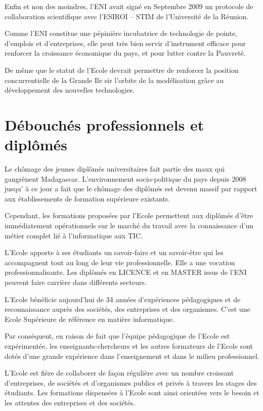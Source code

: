 \documentclass[12pt]{report}
\begin{document}
				Enfin et non des moindres, l’ENI avait signé en Septembre 2009 un protocole de collaboration scientifique avec l’ESIROI – STIM de l’Université de la Réunion.

				Comme l’ENI constitue une pépinière incubatrice de technologie de pointe, d’emplois et d’entreprises, elle peut très bien servir d’instrument efficace pour renforcer la croissance économique du pays, et pour lutter contre la Pauvreté.

				De même que le statut de l’Ecole devrait permettre de renforcer la position concurrentielle de la Grande Ile sir l’orbite de la modélisation grâce au développement des nouvelles technologies.

				\section{Débouchés professionnels et diplômés}

				Le chômage des jeunes diplômés universitaires fait partie des maux qui gangrènent Madagascar. L’environnement socio-politique du pays depuis 2008 jusqu’ à ce jour a fait que le chômage des diplômés est devenu massif par rapport aux établissements de formation supérieure existants. 

				Cependant, les formations proposées par l’Ecole permettent aux diplômés d’être immédiatement opérationnels sur le marché du travail avec la connaissance d’un métier complet lié à l’informatique aux TIC. 

				L’Ecole apporte à ses étudiants un savoir-faire et un savoir-être qui les accompagnent tout au long de leur vie professionnelle. Elle a une vocation professionnalisante. 
Les diplômés en LICENCE et en MASTER issus de l’ENI peuvent faire carrière dans différents secteurs.

				L’Ecole bénéficie aujourd’hui de 34 années d’expériences pédagogiques et de reconnaissance auprès des sociétés, des entreprises et des organismes. C’est une Ecole Supérieure de référence en matière informatique.

				Par conséquent, en raison de fait que l’équipe pédagogique de l’Ecole est expérimentée, les enseignants-chercheurs et les autres formateurs de l’Ecole sont dotés d’une grande expérience dans l’enseignement et dans le milieu professionnel.

				L’Ecole est fière de collaborer de façon régulière avec un nombre croissant d’entreprises, de sociétés et d’organismes publics et privés à travers les stages des étudiants. Les formations dispensées à l’Ecole sont ainsi orientées vers le besoin et les attentes des entreprises et des sociétés. 
\end{document}
